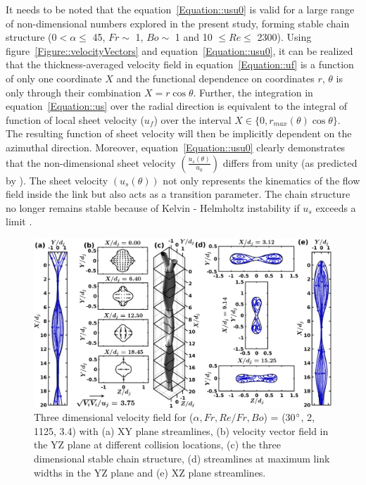 \documentclass[%
 aip,
 sd,%
amsmath,amssymb,
preprint,%
author-year,%
]{revtex4-1}
\begin{document}
{\color{black}It needs to be noted that the equation~\ref{Equation::usu0} is valid for a large range of non-dimensional numbers explored in the present study, forming stable chain structure (0\degree $< \alpha \le$  45\degree, $Fr \sim$ 1, $Bo \sim$ 1 and 10 $\le Re \le$ 2300).} {\color{red} Using figure~\ref{Figure::velocityVectors} and equation~\ref{Equation::usu0}, it can be realized that the thickness-averaged velocity field in equation~\ref{Equation::uf} is a function of only one coordinate $X$ and the functional dependence on coordinates $r$, $\theta$ is only through their combination $X = r\cos\theta$. Further, the integration in equation~\ref{Equation::us} over the radial direction is equivalent to the integral of function of local sheet velocity ($u_f$) over the interval $X \in \{0, r_{max}(\theta)\cos\theta\}$. The resulting function of sheet velocity will then be implicitly dependent on the azimuthal direction. Moreover, equation~\ref{Equation::usu0} clearly demonstrates that the non-dimensional sheet velocity $\left(\frac{u_s(\theta)}{u_0}\right)$ differs from unity (as predicted by \cite{choo2002velocity}). The sheet velocity $\left(u_s(\theta)\right)$ not only represents the kinematics of the flow field inside the link but also acts as a transition parameter. The chain structure no longer remains stable because of Kelvin - Helmholtz instability if $u_s$ exceeds a limit \citep{villermaux2002life}.}\\
\begin{figure}
	\centering
	\includegraphics[width=\linewidth]{Figure6}
	\caption{Three dimensional velocity field for ($\alpha, Fr, Re/Fr, Bo$) = (30$\degree$, 2, 1125, 3.4) with (a) XY plane streamlines, (b) velocity vector field in the YZ plane at different collision locations, (c) the three dimensional stable chain structure, (d) streamlines at maximum link widths in the YZ plane and (e) XZ plane streamlines.}
	\label{Figure::streamDetails}
\end{figure}
\end{document}
